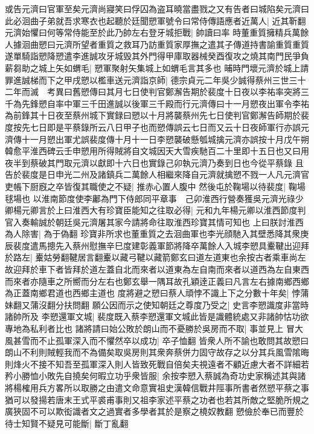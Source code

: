 或告元濟曰官軍至矣元濟尚寢笑曰俘囚為盗耳曉當盡戮之又有告者曰城陷矣元濟曰此必洄曲子弟就吾求寒衣也起聽於廷聞愬軍號令曰常侍傳語應者近萬人|{
	近其靳翻}
元濟始懼曰何等常侍能至於此乃帥左右登牙城拒戰|{
	帥讀曰率}
時董重質擁精兵萬餘人據洄曲愬曰元濟所望者重質之救耳乃訪重質家厚撫之遣其子傳道持書諭重質重質遂單騎詣愬降愬遣李進誠攻牙城毁其外門得甲庫取器械癸酉復攻之燒其南門民爭負薪芻助之城上矢如蝟毛|{
	愬軍聚射矢集城上如蝟毛言其多也}
晡時門壞元濟於城上請罪進誠梯而下之甲戌愬以檻車送元濟詣京師|{
	德宗貞元二年吳少誠得蔡州三世三十二年而滅　考異曰舊愬傳曰其月七日使判官鄭澥告期於裴度十日夜以李祐率突將三千為先鋒愬自率中軍三千田進誠以後軍三千殿而行元濟傳曰十一月愬夜出軍令李祐為前鋒其十日夜至蔡州城下實録曰愬以十月將襲蔡州先七日使判官鄭澥告師期於裴度按先七日即是平蔡錄所云八日甲子也而愬傳誤云七日而又云十日夜師軍行亦誤元濟傳十一月愬出軍尤誤裴度傳十月十一日李愬襲破懸瓠城擒元濟亦誤按十月戊午朔韓愈平淮西碑云壬申愬用所得賊將自文城因天大雪疾馳百二十里即十五日也又曰用夜半到蔡破其門取元濟以獻即十六日也實錄己卯執元濟乃奏到日也今從平蔡錄}
且告於裴度是日申光二州及諸鎮兵二萬餘人相繼來降自元濟就擒愬不戮一人凡元濟官吏帳下厨廐之卒皆復其職使之不疑|{
	推赤心置人腹中}
然後屯於鞠場以待裴度|{
	鞠場毬場也}
以淮南節度使李鄘為門下侍郎同平章事　己卯淮西行營奏獲吳元濟光祿少卿楊元卿言於上曰淮西大有珍寶臣能知之往取必得|{
	元和九年楊元卿以淮西節度判官入奏輸誠於朝廷吳元濟屠其家今請將命往取淮西珍寶其情可知也}
上曰朕討淮西為人除害|{
	為于偽翻}
珍寶非所求也董重質之去洄曲軍也李光顔馳入其壁悉降其衆庚辰裴度遣馬摠先入蔡州慰撫辛巳度建彰義軍節將降卒萬餘人入城李愬具櫜鞬出迎拜於路左|{
	櫜姑勞翻鞬居言翻櫜以藏弓鞬以藏箭鄭玄曰道左道東也余按古者乘車尚左故迎拜於車下者皆拜於道左蓋自北而來者以道東為左自南而來者以道西為左自東西而來者亦隨車之所嚮而分左右也鄭玄舉一隅耳故孔穎逹正義曰凡言左右據南鄉西鄉為正蓋南鄉君道也西鄉主道也}
度將避之愬曰蔡人頑悖不識上下之分數十年矣|{
	悖蒲妹翻又蒲沒翻分扶問翻}
願公因而示之使知朝廷之尊度乃受之|{
	史言李愬識度非當時諸帥所及}
李愬還軍文城|{
	裴度既入蔡李愬還軍文城此皆是識體統處又非諸帥怙功欲專地為私利者比也}
諸將請曰始公敗於朗山而不憂勝於吳房而不取|{
	事並見上}
冒大風甚雪而不止孤軍深入而不懼然卒以成功|{
	卒子恤翻}
皆衆人所不諭也敢問其故愬曰朗山不利則賊輕我而不為備矣取吳房則其衆奔蔡併力固守故存之以分其兵風雪隂晦則烽火不接不知吾至孤軍深入則人皆致死戰自倍矣夫視遠者不顧近慮大者不詳細若矜小勝恤小敗先自撓矣何暇立功乎衆皆服|{
	余按李愬入蔡誠為奇功史家稱述其與諸將楊榷用兵方畧所以取勝之由遣文命意實祖史漢韓信戰井陘事所書者然愬平蔡之事猶可以發揚若唐末王式平裘甫事則又祖李家述平蔡之功者也若其所敵之堅脆所規之廣狹固不可以欺衒識者文之過實者多學者其於是察之橈奴教翻}
愬儉於奉已而豐於待士知賢不疑見可能斷|{
	斷丁亂翻}
